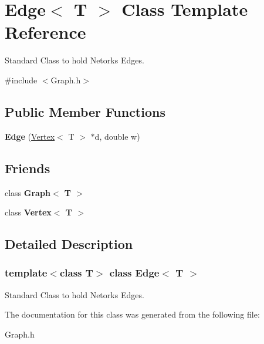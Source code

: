 \hypertarget{class_edge}{}\section{Edge$<$ T $>$ Class Template Reference}
\label{class_edge}


Standard Class to hold Netork\textquotesingle{}s Edges.  




{\ttfamily \#include $<$Graph.\+h$>$}

\subsection*{Public Member Functions}
\begin{DoxyCompactItemize}
\item 
\hypertarget{class_edge_a9da861a03f920c89984be33515a5d870}{}\label{class_edge_a9da861a03f920c89984be33515a5d870} 
{\bfseries Edge} (\hyperlink{class_vertex}{Vertex}$<$ T $>$ $\ast$d, double w)
\end{DoxyCompactItemize}
\subsection*{Friends}
\begin{DoxyCompactItemize}
\item 
\hypertarget{class_edge_aefa9b76cd57411c5354e5620dc2d84dd}{}\label{class_edge_aefa9b76cd57411c5354e5620dc2d84dd} 
class {\bfseries Graph$<$ T $>$}
\item 
\hypertarget{class_edge_a2e120a12dec663fa334633b4f26cbed8}{}\label{class_edge_a2e120a12dec663fa334633b4f26cbed8} 
class {\bfseries Vertex$<$ T $>$}
\end{DoxyCompactItemize}


\subsection{Detailed Description}
\subsubsection*{template$<$class T$>$\newline
class Edge$<$ T $>$}

Standard Class to hold Netork\textquotesingle{}s Edges. 

The documentation for this class was generated from the following file\+:\begin{DoxyCompactItemize}
\item 
Graph.\+h\end{DoxyCompactItemize}
